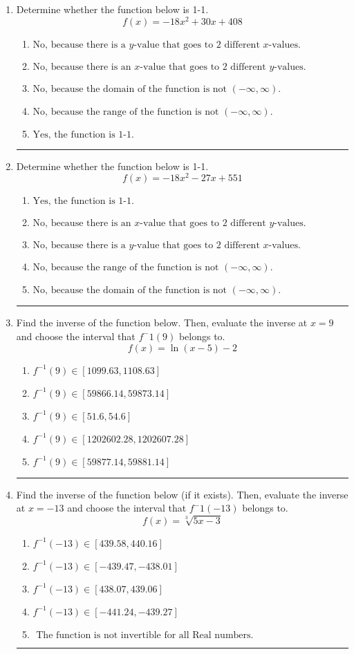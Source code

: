 \documentclass[14pt]{extbook}
\newcommand{\litem}[1]{\item#1\hspace*{-1cm}\rule{\textwidth}{0.4pt}}
\begin{document}
\begin{enumerate}
{\begin{enumerate}[label=\Alph*.]
\end{enumerate} }
\litem{
Determine whether the function below is 1-1.\[ f(x) = -18 x^2 + 30 x + 408 \]\begin{enumerate}[label=\Alph*.]
\item \( \text{No, because there is a $y$-value that goes to 2 different $x$-values.} \)
\item \( \text{No, because there is an $x$-value that goes to 2 different $y$-values.} \)
\item \( \text{No, because the domain of the function is not $(-\infty, \infty)$.} \)
\item \( \text{No, because the range of the function is not $(-\infty, \infty)$.} \)
\item \( \text{Yes, the function is 1-1.} \)

\end{enumerate} }
\litem{
Determine whether the function below is 1-1.\[ f(x) = -18 x^2 - 27 x + 551 \]\begin{enumerate}[label=\Alph*.]
\item \( \text{Yes, the function is 1-1.} \)
\item \( \text{No, because there is an $x$-value that goes to 2 different $y$-values.} \)
\item \( \text{No, because there is a $y$-value that goes to 2 different $x$-values.} \)
\item \( \text{No, because the range of the function is not $(-\infty, \infty)$.} \)
\item \( \text{No, because the domain of the function is not $(-\infty, \infty)$.} \)

\end{enumerate} }
\litem{
Find the inverse of the function below. Then, evaluate the inverse at $x = 9$ and choose the interval that $f^-1(9)$ belongs to.\[ f(x) = \ln{(x-5)}-2 \]\begin{enumerate}[label=\Alph*.]
\item \( f^{-1}(9) \in [1099.63, 1108.63] \)
\item \( f^{-1}(9) \in [59866.14, 59873.14] \)
\item \( f^{-1}(9) \in [51.6, 54.6] \)
\item \( f^{-1}(9) \in [1202602.28, 1202607.28] \)
\item \( f^{-1}(9) \in [59877.14, 59881.14] \)

\end{enumerate} }
\litem{
Find the inverse of the function below (if it exists). Then, evaluate the inverse at $x = -13$ and choose the interval that $f^-1(-13)$ belongs to.\[ f(x) = \sqrt[3]{5 x - 3} \]\begin{enumerate}[label=\Alph*.]
\item \( f^{-1}(-13) \in [439.58, 440.16] \)
\item \( f^{-1}(-13) \in [-439.47, -438.01] \)
\item \( f^{-1}(-13) \in [438.07, 439.06] \)
\item \( f^{-1}(-13) \in [-441.24, -439.27] \)
\item \( \text{ The function is not invertible for all Real numbers. } \)


\end{enumerate}}
\end{enumerate}
\end{document}
